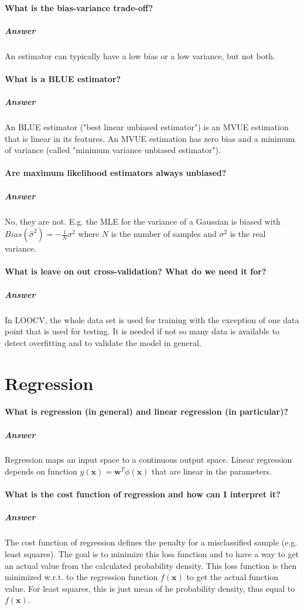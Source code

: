 \documentclass[a4paper, 11pt, accentcolor = tud3b]{tudreport}
\newcommand{\answer}[1]{\subparagraph{Answer} #1}
\newcommand{\Bias}{\ensuremath{\textit{Bias}}}
\renewcommand{\vec}[1]{\mathbf{#1}}
\begin{document}
			\paragraph{What is the bias-variance trade-off?}
			\answer{An estimator can typically have a low bias or a low variance, but not both.}

			\paragraph{What is a BLUE estimator?}
			\answer{An BLUE estimator ("best linear unbiased estimator") is an MVUE estimation that is linear in its features. An MVUE estimation has zero bias and a minimum of variance (called "minimum variance unbiased estimator").}

			\paragraph{Are maximum likelihood estimators always unbiased?}
			\answer{No, they are not. E.g. the MLE for the variance of a Gaussian is biased with \( \Bias(\hat{\sigma}^2) = -\frac{1}{N} \sigma^2 \) where \(N\) is the number of samples and \(\sigma^2\) is the real variance.}

			\paragraph{What is leave on out cross-validation? What do we need it for?}
			\answer{In LOOCV, the whole data set is used for training with the exception of one data point that is used for testing. It is needed if not so many data is available to detect overfitting and to validate the model in general.}

		\section{Regression}
			\paragraph{What is regression (in general) and linear regression (in particular)?}
			\answer{Regression maps an input space to a continuous output space. Linear regression depends on function \( y(\vec{x}) = \vec{w}^T \phi(\vec{x}) \) that are linear in the parameters.}

			\paragraph{What is the cost function of regression and how can I interpret it?}
			\answer{The cost function of regression defines the penalty for a misclassified sample (e.g. least squares). The goal is to minimize this loss function and to have a way to get an actual value from the calculated probability density. This loss function is then minimized w.r.t. to the regression function \( f(\vec{x}) \) to get the actual function value. For least squares, this is just mean of he probability density, thus equal to \( f(\vec{x}) \).}
\end{document}

